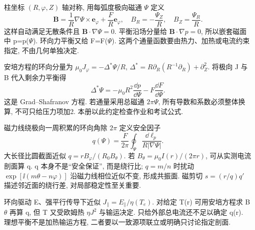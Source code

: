 \label{ch:gs}
柱坐标 $(R,\varphi,Z)$ 轴对称, 用每弧度极向磁通 $\Psi$ 定义
\begin{equation}
 \mathbf B=\frac1R\nabla\Psi\times\mathbf e_\varphi+\frac{F}{R}\mathbf e_\varphi,
 \quad B_R=-\frac{\Psi_Z}R,\quad B_Z=\frac{\Psi_R}R.
\end{equation}
这样自动满足无散条件且 $\mathbf B\cdot\nabla\Psi=0$. 平衡沿场分量给 $\mathbf B\cdot\nabla p=0$, 所以嵌套磁面中 p=p(\ensuremath{\Psi}). 环向力平衡又给 F=F(\ensuremath{\Psi}). 这两个通量函数要由热力、加热或电流约束指定, 不由几何单独决定.

安培方程的环向分量为 $\mu_0J_\varphi=-\Delta^*\Psi/R$, $\Delta^*=R\partial_R(R^{-1}\partial_R)+\partial_Z^2$. 将极向 J 与 B 代入剩余力平衡得
\begin{equation}\label{eq:gs}
 \Delta^*\Psi=-\mu_0R^2\frac{\dd p}{\dd\Psi}-F\frac{\dd F}{\dd\Psi}.
\end{equation}
这是 Grad--Shafranov 方程. 若通量采用总磁通 $2\pi\Psi$, 所有导数和系数必须整体换算, 不可只给压力项加2. 本册以此约定检查作业和考试公式.

磁力线绕极向一周积累的环向角除 $2\pi$ 定义安全因子
\begin{equation}
 q(\Psi)=\frac{F}{2\pi}\oint_\Psi\frac{\dd\ell_p}{R|\nabla\Psi|}.
\end{equation}
大长径比圆截面近似 $q=rB_\varphi/(R_0B_\theta)$. 若 $B_\theta=\mu_0I(r)/(2\pi r)$, 可从实测电流剖面算 q. q 本身不是``安全保证'', 而是绕行比; $q=m/n$ 时扰动 $\exp[\ii(m\theta-n\varphi)]$ 沿磁力线相位近似不变, 形成共振面. 磁剪切 $s=(r/q)q'$ 描述邻近面的绕行差, 对局部稳定性至关重要.

环向驱动 E、强平行传导下近似 $J_\parallel=E_\parallel/\eta(T_e)$. 对给定 T(r) 可用安培方程求 B\ensuremath{\theta} 再算 q, 但 T 又受欧姆热 $\eta J^2$ 与输运决定. 只给外部总电流还不足以确定 q(r). 理想平衡不是加热输运方程, 二者要以一致源项联立或明确只讨论指定剖面.
